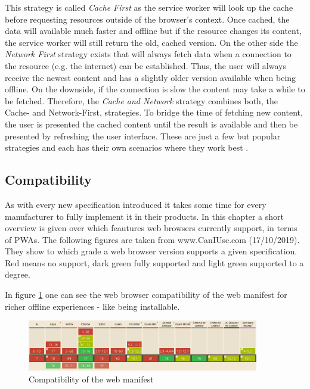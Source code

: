 This strategy is called \textit{Cache First} as the service worker will look up the cache before requesting resources outside of the browser’s context. Once cached, the data will available much faster and offline but if the resource changes its content, the service worker will still return the old, cached version. On the other side the \textit{Network First} strategy exists that will always fetch data when a connection to the resource (e.g. the internet) can be established. Thus, the user will always receive the newest content and has a slightly older version available when being offline. On the downside, if the connection is slow the content may take a while to be fetched. Therefore, the \textit{Cache and Network} strategy combines both, the Cache- and Network-First, strategies. To bridge the time of fetching new content, the user is presented the cached content until the result is available and then be presented by refreshing the user interface. These are just a few but popular strategies and each has their own scenarios where they work best \cite[pp. 109-111]{hajianProgressiveWebApps2019}.

\subsection{Compatibility}
\label{sec:theorieCd}


As with every new specification introduced it takes some time for every manufacturer to fully implement it in their products. In this chapter a short overview is given over which feautures web browsers currently support, in terms of PWAs. The following figures are taken from www.CanIUse.com (17/10/2019). They show to which grade a web browser version supports a given specification. Red means no support, dark green fully supported and light green supported to a degree.

In figure \ref{fig:pwacompatibilitywebmanifest} one can see the web browser compatibility of the web manifest for richer offline experiences - like being installable.

\begin{figure}[htbp] 
	\centering
	\includegraphics[width=0.9\textwidth]{Assets/chapter_pwa/webmanifestsupport.PNG}
	\caption{Compatibility of the web manifest}
	\label{fig:pwacompatibilitywebmanifest}
\end{figure}


